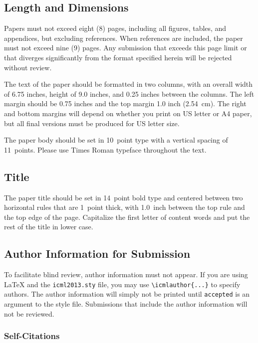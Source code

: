 \documentclass{article}
\begin{document}
\subsection{Length and Dimensions}

Papers must not exceed eight (8) pages, including all figures, tables,
and appendices, but excluding references. When references are included,
the paper must not exceed nine (9) pages. Any submission that exceeds 
this page limit or that diverges significantly from the format specified 
herein will be rejected without review.

The text of the paper should be formatted in two columns, with an
overall width of 6.75 inches, height of 9.0 inches, and 0.25 inches
between the columns. The left margin should be 0.75 inches and the top
margin 1.0 inch (2.54~cm). The right and bottom margins will depend on
whether you print on US letter or A4 paper, but all final versions
must be produced for US letter size.

The paper body should be set in 10~point type with a vertical spacing
of 11~points. Please use Times Roman typeface throughout the text.

\subsection{Title}

The paper title should be set in 14~point bold type and centered
between two horizontal rules that are 1~point thick, with 1.0~inch
between the top rule and the top edge of the page. Capitalize the
first letter of content words and put the rest of the title in lower
case.

\subsection{Author Information for Submission}
\label{author info}

To facilitate blind review, author information must not appear.  If
you are using \LaTeX\/ and the \texttt{icml2013.sty} file, you may use
\verb+\icmlauthor{...}+ to specify authors.  The author information
will simply not be printed until {\tt accepted} is an argument to the
style file. Submissions that include the author information will not
be reviewed.

\subsubsection{Self-Citations}
\end{document}
